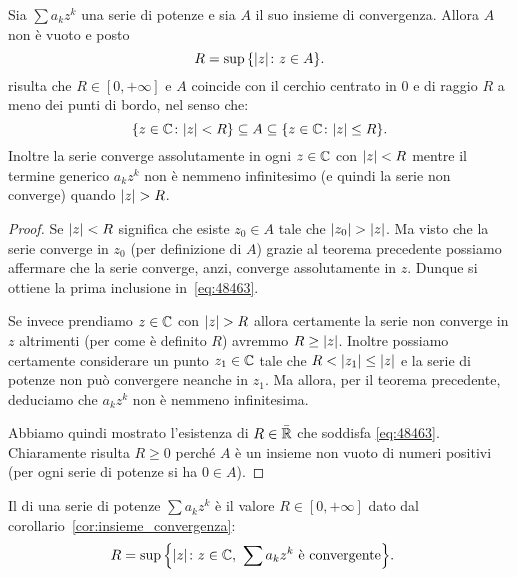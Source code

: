 \begin{corollary}%
\mymark{**}
\label{cor:insieme_convergenza}%
Sia $\sum a_k z^k$ una serie di potenze e sia $A$ il suo insieme di convergenza.
Allora $A$ non è vuoto e posto
\[
  R= \sup {\left\{ {\left|z\right|}\colon z\in A \right\}}.
\]
risulta che $R\in[0,+\infty]$ e $A$ coincide con il cerchio centrato in $0$
e di raggio $R$ a meno dei punti di bordo, nel senso che:
\begin{equation}\label{eq:48463}
   {\left\{ z\in \mathbb C\colon {\left|z\right|} < R \right\}}
   \subseteq A
   \subseteq {\left\{ z\in \mathbb C\colon {\left|z\right|}\le R \right\}}.
\end{equation}
Inoltre la serie converge assolutamente in ogni $z\in \mathbb C$ con ${\left|z\right|}<R$
mentre
il termine generico $a_k z^k$ non è nemmeno infinitesimo (e quindi la serie non converge)
quando ${\left|z\right|}>R$.
\end{corollary}
%
\begin{proof}
Se ${\left|z\right|}<R$ significa che esiste $z_0\in A$ tale che ${\left|z_0\right|} > {\left|z\right|}$.
Ma visto che la serie converge in $z_0$ (per definizione di $A$) grazie al teorema
precedente possiamo affermare che la serie converge, anzi, converge assolutamente
in $z$. Dunque si ottiene la prima inclusione in~\eqref{eq:48463}.

Se invece prendiamo $z\in \mathbb C$ con ${\left|z\right|}>R$ allora
certamente la serie non converge in $z$ altrimenti (per come è definito $R$)
avremmo $R\ge {\left|z\right|}$.
Inoltre possiamo certamente considerare un punto $z_1\in\mathbb C$
tale che $R < {\left|z_1\right|} \le {\left|z\right|}$ e la serie
di potenze non può convergere neanche in $z_1$.
Ma allora, per il teorema precedente,
deduciamo che $a_k z^k$ non è nemmeno infinitesima.

Abbiamo quindi mostrato l'esistenza di $R\in \bar {\mathbb R}$ che soddisfa \eqref{eq:48463}.
Chiaramente risulta $R\ge 0$ perché $A$ è un insieme non vuoto di numeri positivi
(per ogni serie di potenze si ha $0\in A$).
\end{proof}

\begin{definition}
\mymark{**}
Il  di una serie di potenze $\sum a_k z^k$
è il valore $R\in[0,+\infty]$
dato dal corollario~\ref{cor:insieme_convergenza}:
\begin{align*}
  R &= \sup {\left\{ {\left|z\right|}\colon z\in \mathbb C,\ \sum a_k z^k \text{ è convergente} \right\}}.
\end{align*}
\end{definition}

